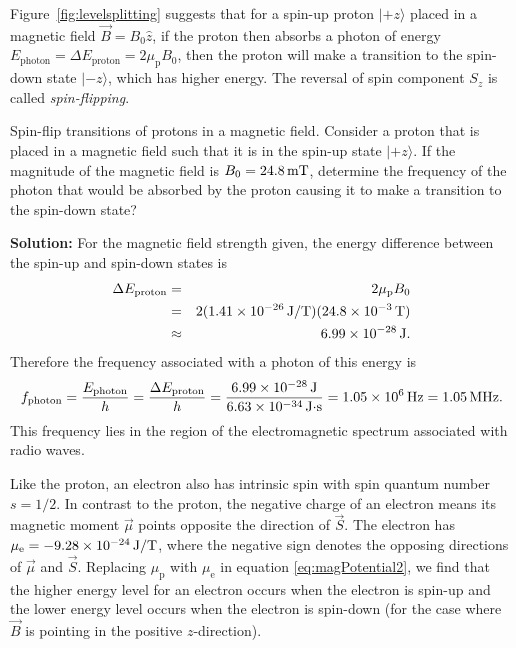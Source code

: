 Figure~\ref{fig:levelsplitting} suggests that for a spin-up proton
$|\mbox{$+z$}\rangle$ placed in a magnetic field $\vec{B} = B_0 \hat{z}$,
if the proton then absorbs a photon of energy 
$E_\text{photon} = \Delta E_\text{proton} =
2 \mu_\text{p} B_0$, then the proton will make a transition to the spin-down
state $|\mbox{$-z$}\rangle$, which has higher energy. 
The reversal of spin component $S_z$ is called {\it spin-flipping}.

\begin{example}{Spin-flip transitions of protons in a magnetic field.} 
\label{example:spinFlip}
Consider a proton that is placed in a magnetic field such that it is in the spin-up state $|\mbox{$+z$}\rangle$. If the magnitude of the magnetic field is $B_0 = 24.8 \,\mbox{mT}$, determine the frequency of the photon that would be absorbed by the proton causing it to make a transition to the spin-down state?

{\bf Solution:} For the magnetic field strength given, the energy difference between the spin-up and spin-down states is 
\begin{eqnarray}
\Delta E_\text{proton} 
  &=& 2 \mu_\text{p} B_0 \nonumber \\
  &=& 2 (1.41 \times 10^{-26} \,\mbox{J/T}) (24.8 \times 10^{-3} \,\mbox{T}) 
                              \nonumber \\ 
  &\approx& 6.99 \times 10^{-28} \,\mbox{J} .
\end{eqnarray}
Therefore the frequency associated with a photon of this energy is
\begin{equation}
f_\text{photon} = \frac{E_\text{photon}}{h} = \frac{\Delta E_\text{proton}}{h} 
  = \frac{6.99 \times 10^{-28} \,\mbox{J}}{6.63 \times 10^{-34} \,\mbox{J$\cdot$s}} = 1.05 \times 10^{6} \,\mbox{Hz} = 1.05 \,\mbox{MHz} . \nonumber
\end{equation}
This frequency lies in the region of the electromagnetic spectrum associated with radio waves.
\end{example}

Like the proton, an electron also has intrinsic spin with spin quantum 
number $s = 1/2$.  In contrast to the proton, the negative charge of an
electron means its magnetic moment $\vec{\mu}$ points opposite the 
direction of $\vec{S}$.  The electron has
$\mu_\text{e} = -9.28 \times 10^{-24} \,\mbox{J/T}$, where the negative sign
 denotes the opposing directions of $\vec{\mu}$ and $\vec{S}$.   
Replacing $\mu_\text{p}$ with $\mu_\text{e}$ in equation \ref{eq:magPotential2},
 we find that the higher energy level for an electron occurs when the electron is spin-up and the lower energy level occurs when the electron is spin-down (for the case where $\vec{B}$ is pointing in the positive $z$-direction). 


